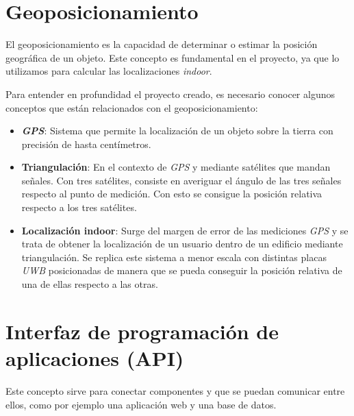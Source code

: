 \section{Geoposicionamiento}

El geoposicionamiento es la capacidad de determinar o estimar la posición geográfica de un objeto\cite{GeoPosicionamiento}. Este concepto es fundamental en el proyecto, ya que lo utilizamos para calcular las localizaciones \textit{indoor}.

Para entender en profundidad el proyecto creado, es necesario conocer algunos conceptos que están relacionados con el geoposicionamiento:

\begin{itemize}
    \item \textit{\textbf{GPS}}: Sistema que permite la localización de un objeto sobre la tierra con precisión de hasta centímetros.\cite{wiki:gps}
    \item \textbf{Triangulación}: En el contexto de \textit{GPS} y mediante satélites que mandan señales. Con tres satélites, consiste en averiguar el ángulo de las tres señales respecto al punto de medición. Con esto se consigue la posición relativa respecto a los tres satélites.
    \item \textbf{Localización indoor}: Surge del margen de error de las mediciones \textit{GPS} y se trata de obtener la localización de un usuario dentro de un edificio mediante triangulación. Se replica este sistema a menor escala con distintas placas \textit{UWB} posicionadas de manera que se pueda conseguir la posición relativa de una de ellas respecto a las otras.
\end{itemize}


\section{Interfaz de programación de aplicaciones (API)}
Este concepto sirve para conectar componentes y que se puedan comunicar entre ellos, como por ejemplo una aplicación web y una base de datos.

